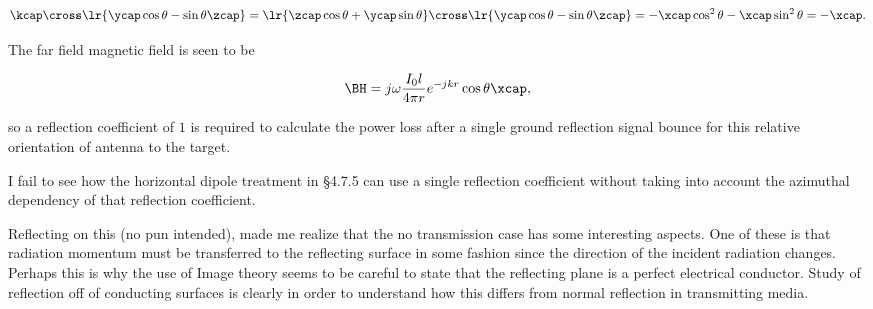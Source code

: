 \begin{dmath}\label{eqn:chapter4Notes:740}
\kcap \cross
\lr{ \ycap \cos\theta - \sin\theta \zcap }
=
\lr{ \zcap \cos\theta + \ycap \sin\theta } \cross
\lr{ \ycap \cos\theta - \sin\theta \zcap }
=
-\xcap \cos^2 \theta - \xcap \sin^2\theta
= -\xcap.
\end{dmath}

The far field magnetic field is seen to be

\begin{dmath}\label{eqn:chapter4Notes:721}
\BH =
j \omega \frac{I_0 l}{4 \pi r} e^{-j k r}
\cos\theta \xcap,
\end{dmath}

so a reflection coefficient of \( 1 \) is required to calculate the power loss after a single ground reflection signal bounce for this relative orientation of antenna to the target.

I fail to see how the horizontal dipole treatment in \S 4.7.5 can use a single reflection coefficient without taking into account the azimuthal dependency of that reflection coefficient.

Reflecting on this (no pun intended), made me realize that the no transmission case has some interesting aspects.  One of these is that radiation momentum must be transferred to the reflecting surface in some fashion since the direction of the incident radiation changes.  Perhaps this is why the use of Image theory seems to be careful to state that the reflecting plane is a perfect electrical conductor.  Study of reflection off of conducting surfaces is clearly in order to understand how this differs from normal reflection in transmitting media.

